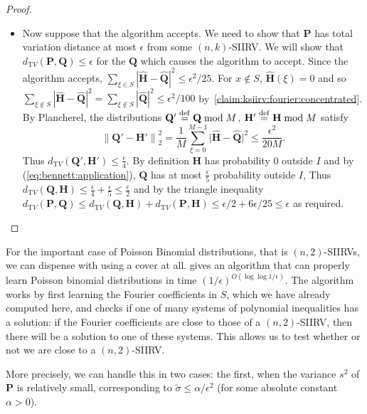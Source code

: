 \documentclass[11pt]{article}
\makeatletter
\renewcommand{\subsection}{\@startsection{subsection}{2}{0pt}{-12pt}{-5pt}{\normalsize\bf}}
\theoremstyle{definition}
\newcommand{\p}{\mathbf{P}}
\newcommand{\q}{\mathbf{Q}}
\newcommand{\h}{\mathbf{H}}
\newcommand{\dtv}{d_{\mathrm TV}}
\newcommand{\eps}{\epsilon}
\newcommand{\norm}[1]{\lVert#1\rVert}
\newcommand{\eqdef}{\stackrel{{\mathrm {\footnotesize def}}}{=}}
\newcommand{\normtwo}[1]{{\norm{#1}}_2}
\newcommand{\dabs}[1]{\lvert #1 \rvert}
\newcommand{\fourier}[1]{\widehat{#1}}
\makeatother
\begin{document}
\begin{proof}
\begin{itemize}
  \item Now suppose that the algorithm accepts. We need to show that $\p$ has total variation distance at most $\eps$ from some $(n,k)$-SIIRV. We will show that $\dtv(\p,\q) \leq \eps$ for the $\q$ which causes the algorithm to accept.  Since the algorithm accepts, $\sum_{\xi \in S} |\fourier{\h}-\fourier{\q}|^2 \leq \eps^2/25$. 
For $x \notin S$, $\fourier{\h}(\xi)=0$ and so $\sum_{\xi \notin S} |\fourier{\h}-\fourier{\q}|^2 = \sum_{\xi \notin S} |\fourier{\q}|^2 \leq \eps^2/100$ by~\cref{claim:ksiirv:fourier:concentrated}. By Plancherel, the distributions $\q'\eqdef \q \bmod M$, $\h'\eqdef \h \bmod M$ satisfy 
\[
  \normtwo{ \q'-\h'}^2 = \frac{1}{M}\sum_{\xi=0}^{M-1} \dabs{ \fourier{\h}-\fourier{\q} }^2 \leq \frac{\eps^2}{20M}.
\] Thus $\dtv(\q',\h') \leq \frac{\eps}{4}$. By definition $\h$ has probability $0$ outside $I$ and by (\ref{eq:bennett:application}), $\q$ has at most $\frac{\eps}{5}$ probability outside $I$, Thus $\dtv(\q,\h) \leq \frac{\eps}{4}+\frac{\eps}{5} \leq \frac{\eps}{2}$ and by the triangle inequality $\dtv(\p,\q) \leq \dtv(\q,\h) + \dtv(\p,\h) \leq \eps/2 + 6\eps/25 \leq \eps$ as required.
\end{itemize}
\end{proof}

\subsection{The case $k=2$}
For the important case of Poisson Binomial distributions, that is $(n,2)$-SIIRVs, we can dispense with using a cover at all. \cite{DKS15b} gives an algorithm that can properly learn Poisson binomial distributions in time $(1/\eps)^{O(\log \log 1/\eps)}$. The algorithm works by first learning the Fourier coefficients in $S$, which we have already computed here, and checks if one of many systems of polynomial inequalities has a solution: if the Fourier coefficients are close to those of a $(n,2)$-SIIRV, then there will be a solution to one of these systems. This allows us to test whether or not we are close to a $(n,2)$-SIIRV.

More precisely, we can handle this in two cases: the first, when the variance $s^2$ of $\p$ is relatively small, corresponding to $\widetilde{\sigma} \leq \alpha/\eps^2$ (for some absolute constant $\alpha >0$).
\end{document}
